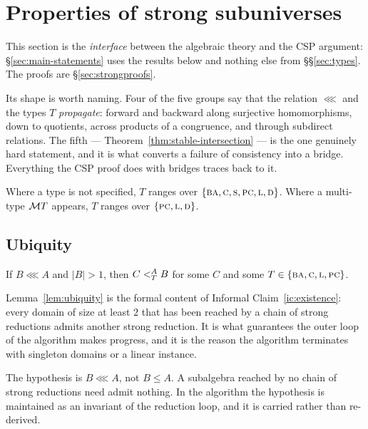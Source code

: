 \section{Properties of strong subuniverses}\label{sec:properties}

This section is the \emph{interface} between the algebraic theory and the CSP
argument: \S\ref{sec:main-statements} uses the results below and nothing else
from \S\S\ref{sec:types}. The proofs are \S\ref{sec:strongproofs}.

Its shape is worth naming. Four of the five groups say that the relation
$\lll$ and the types $T$ \emph{propagate}: forward and backward along
surjective homomorphisms, down to quotients, across products of a congruence,
and through subdirect relations. The fifth --- Theorem~\ref{thm:stable-intersection}
--- is the one genuinely hard statement, and it is what converts a failure of
consistency into a bridge. Everything the CSP proof does with bridges traces
back to it.

\begin{convention}\label{conv:type-quantifier}
Where a type is not specified, $T$ ranges over
$\{\TBA,\TC,\TS,\TPC,\TL,\TD\}$. Where a multi-type $\MT T$ appears,
$T$ ranges over $\{\TPC,\TL,\TD\}$.
\end{convention}

\subsection{Ubiquity}

\begin{lemma}[Ubiquity]\label{lem:ubiquity}
If $B\lll A$ and $|B|>1$, then $C\subt[A]{T}B$ for some $C$ and some
$T\in\{\TBA,\TC,\TL,\TPC\}$.
\end{lemma}

Lemma~\ref{lem:ubiquity} is the formal content of Informal
Claim~\ref{ic:existence}: every domain of size at least $2$ that has been
reached by a chain of strong reductions admits another strong reduction. It
is what guarantees the outer loop of the algorithm makes progress, and it is
the reason the algorithm terminates with singleton domains or a linear
instance.

\begin{hazard}\label{haz:ubiquity-hyp}
The hypothesis is $B\lll A$, not $B\le A$. A subalgebra reached by no chain of
strong reductions need admit nothing. In the algorithm the hypothesis is
maintained as an invariant of the reduction loop, and it is carried rather than
re-derived.
\end{hazard}

